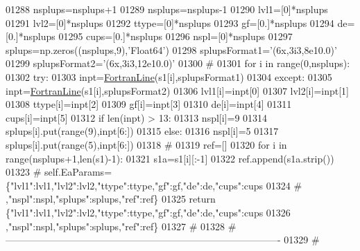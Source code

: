 \begin{DoxyCode}
01288             nsplups=nsplups+1
01289         nsplups=nsplups-1
01290         lvl1=[0]*nsplups
01291         lvl2=[0]*nsplups
01292         ttype=[0]*nsplups
01293         gf=[0.]*nsplups
01294         de=[0.]*nsplups
01295         cups=[0.]*nsplups
01296         nspl=[0]*nsplups
01297         splups=np.zeros((nsplups,9),\textcolor{stringliteral}{'Float64'})
01298         splupsFormat1=\textcolor{stringliteral}{'(6x,3i3,8e10.0)'}
01299         splupsFormat2=\textcolor{stringliteral}{'(6x,3i3,12e10.0)'}
01300         \textcolor{comment}{#}
01301         \textcolor{keywordflow}{for} i \textcolor{keywordflow}{in} range(0,nsplups):
01302             \textcolor{keywordflow}{try}:
01303                 inpt=\hyperlink{classpyneb_1_1utils_1_1_fortran_format_1_1_fortran_line}{FortranLine}(s1[i],splupsFormat1)
01304             \textcolor{keywordflow}{except}:
01305                 inpt=\hyperlink{classpyneb_1_1utils_1_1_fortran_format_1_1_fortran_line}{FortranLine}(s1[i],splupsFormat2)
01306             lvl1[i]=inpt[0]
01307             lvl2[i]=inpt[1]
01308             ttype[i]=inpt[2]
01309             gf[i]=inpt[3]
01310             de[i]=inpt[4]
01311             cups[i]=inpt[5]
01312             \textcolor{keywordflow}{if} len(inpt)  > 13:
01313                 nspl[i]=9
01314                 splups[i].put(range(9),inpt[6:])
01315             \textcolor{keywordflow}{else}:
01316                 nspl[i]=5
01317                 splups[i].put(range(5),inpt[6:])
01318         \textcolor{comment}{#}
01319         ref=[]
01320         \textcolor{keywordflow}{for} i \textcolor{keywordflow}{in} range(nsplups+1,len(s1)-1):
01321             s1a=s1[i][:-1]
01322             ref.append(s1a.strip())
01323 \textcolor{comment}{#        self.EaParams=\{"lvl1":lvl1,"lvl2":lvl2,"ttype":ttype,"gf":gf,"de":de,"cups":cups}
01324 \textcolor{comment}{#                ,"nspl":nspl,"splups":splups,"ref":ref\}}
01325         \textcolor{keywordflow}{return} \{\textcolor{stringliteral}{"lvl1"}:lvl1,\textcolor{stringliteral}{"lvl2"}:lvl2,\textcolor{stringliteral}{"ttype"}:ttype,\textcolor{stringliteral}{"gf"}:gf,\textcolor{stringliteral}{"de"}:de,\textcolor{stringliteral}{"cups"}:cups
01326                 ,\textcolor{stringliteral}{"nspl"}:nspl,\textcolor{stringliteral}{"splups"}:splups,\textcolor{stringliteral}{"ref"}:ref\}
01327     \textcolor{comment}{#}
01328     \textcolor{comment}{# -------------------------------------------------------------------------------------}
01329     \textcolor{comment}{#}
\end{DoxyCode}
\hypertarget{namespacepyneb_1_1utils_1_1__chianti__tools_aa36b22e4e67bccdea3436dcc05e7ba5b}{}
